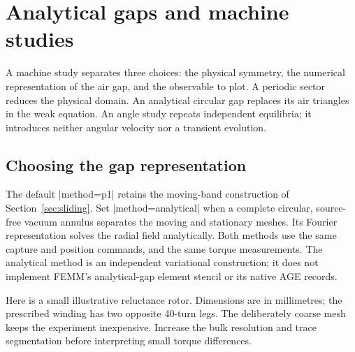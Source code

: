 \section{Analytical gaps and machine studies}
\label{sec:machine-studies}

A machine study separates three choices: the physical symmetry, the numerical
representation of the air gap, and the observable to plot. A periodic sector
reduces the physical domain. An analytical circular gap replaces its air
triangles in the weak equation. An angle study repeats independent equilibria;
it introduces neither angular velocity nor a transient evolution.

\subsection{Choosing the gap representation}

The default |method=p1| retains the moving-band construction of
Section~\ref{sec:sliding}. Set |method=analytical| when a complete circular,
source-free vacuum annulus separates the moving and stationary meshes. Its
Fourier representation solves the radial field analytically. Both methods use
the same capture and position commands, and the same torque measurements.
The analytical method is an independent variational construction; it does not
implement FEMM's analytical-gap element stencil or its native AGE records.

Here is a small illustrative reluctance rotor. Dimensions are in millimetres;
the prescribed winding has two opposite 40-turn legs. The deliberately coarse
mesh keeps the experiment inexpensive. Increase the bulk resolution and trace
segmentation before interpreting small torque differences.

\begin{codeexample}[width=5cm]
\end{codeexample}

